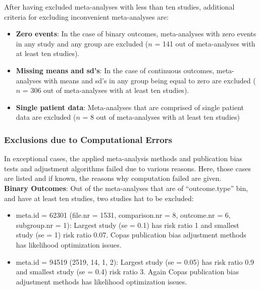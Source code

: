 After having excluded meta-analyses with less than ten studies, additional criteria for excluding inconvenient meta-analyses are:
\begin{itemize}
\item \textbf{Zero events}: In the case of binary outcomes, meta-analyses with zero events in any study and any group are excluded ($n$ = 141 out of meta-analyses with at least ten studies).
\item \textbf{Missing means and sd's}: In the case of continuous outcomes, meta-analyses with means and sd's in any group being equal to zero are excluded ($n$ = 306 out of meta-analyses with at least ten studies).
\item \textbf{Single patient data}: Meta-analyses that are comprised of single patient data are excluded ($n$ = 8 out of meta-analyses with at least ten studies)
\end{itemize}

\subsubsection{Exclusions due to Computational Errors}
In exceptional cases, the applied meta-analysis methods and publication bias tests and adjustment algorithms failed due to various reasons. Here, those cases are listed and if known, the reasons why computation failed are given.\\
\textbf{Binary Outcomes}: Out of the meta-analyses that are of ``outcome.type'' bin, and have at least ten studies, two studies hat to be excluded:
\begin{itemize}
\item meta.id = 62301 (file.nr = 1531, comparison.nr = 8, outcome.nr = 6, subgroup.nr = 1):
Largest study (se = 0.1) has risk ratio 1 and smallest study (se = 1) risk ratio 0.07. Copas publication bias adjustment methods has likelihood optimization issues.
\item meta.id = 94519 (2519, 14, 1, 2): Largest study (se = 0.05) has risk ratio 0.9 and smallest study (se = 0.4) risk ratio 3. Again Copas publication bias adjustment methods has likelihood optimization issues.
\end{itemize}

